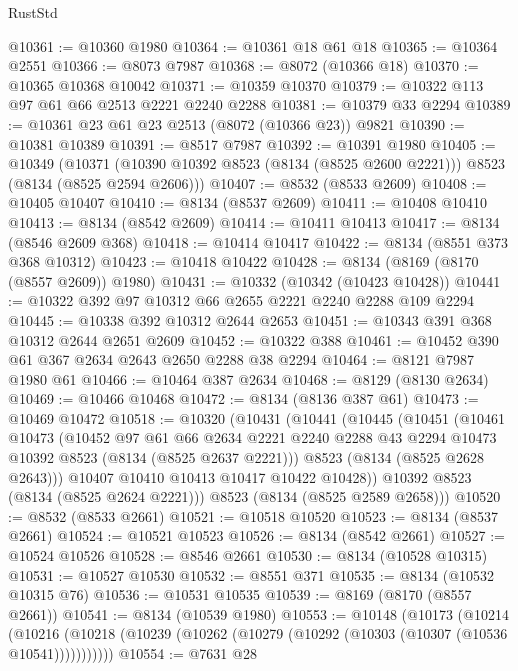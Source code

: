 \begin{lexlean}{RustStd}
\begin{coremodule}
{\begin{coremodule}
{{{{{{{{{{{{{{{{{{{{{{{{{{{{{{{{{{{{{{{{{{{{{{{{{{{{{@10361 := @10360 @1980
@10364 := @10361 @18 @61 @18
@10365 := @10364 @2551
@10366 := @8073 @7987
@10368 := @8072 (@10366 @18)
@10370 := @10365 @10368 @10042
@10371 := @10359 @10370
@10379 := @10322 @113 @97 @61 @66 @2513 @2221 @2240 @2288
@10381 := @10379 @33 @2294
@10389 := @10361 @23 @61 @23 @2513 (@8072 (@10366 @23)) @9821
@10390 := @10381 @10389
@10391 := @8517 @7987
@10392 := @10391 @1980
@10405 := @10349
    (@10371 (@10390 @10392 @8523 (@8134 (@8525 @2600 @2221))) @8523 (@8134 (@8525 @2594 @2606)))
@10407 := @8532 (@8533 @2609)
@10408 := @10405 @10407
@10410 := @8134 (@8537 @2609)
@10411 := @10408 @10410
@10413 := @8134 (@8542 @2609)
@10414 := @10411 @10413
@10417 := @8134 (@8546 @2609 @368)
@10418 := @10414 @10417
@10422 := @8134 (@8551 @373 @368 @10312)
@10423 := @10418 @10422
@10428 := @8134 (@8169 (@8170 (@8557 @2609)) @1980)
@10431 := @10332 (@10342 (@10423 @10428))
@10441 := @10322 @392 @97 @10312 @66 @2655 @2221 @2240 @2288 @109 @2294
@10445 := @10338 @392 @10312 @2644 @2653
@10451 := @10343 @391 @368 @10312 @2644 @2651 @2609
@10452 := @10322 @388
@10461 := @10452 @390 @61 @367 @2634 @2643 @2650 @2288 @38 @2294
@10464 := @8121 @7987 @1980 @61
@10466 := @10464 @387 @2634
@10468 := @8129 (@8130 @2634)
@10469 := @10466 @10468
@10472 := @8134 (@8136 @387 @61)
@10473 := @10469 @10472
@10518 := @10320
    (@10431
      (@10441
        (@10445
          (@10451
            (@10461
              @10473
              (@10452
                @97
                @61
                @66
                @2634
                @2221
                @2240
                @2288
                @43
                @2294
                @10473
                @10392
                @8523
                (@8134 (@8525 @2637 @2221)))
              @8523
              (@8134 (@8525 @2628 @2643)))
            @10407
            @10410
            @10413
            @10417
            @10422
            @10428))
        @10392
        @8523
        (@8134 (@8525 @2624 @2221)))
      @8523
      (@8134 (@8525 @2589 @2658)))
@10520 := @8532 (@8533 @2661)
@10521 := @10518 @10520
@10523 := @8134 (@8537 @2661)
@10524 := @10521 @10523
@10526 := @8134 (@8542 @2661)
@10527 := @10524 @10526
@10528 := @8546 @2661
@10530 := @8134 (@10528 @10315)
@10531 := @10527 @10530
@10532 := @8551 @371
@10535 := @8134 (@10532 @10315 @76)
@10536 := @10531 @10535
@10539 := @8169 (@8170 (@8557 @2661))
@10541 := @8134 (@10539 @1980)
@10553 := @10148
    (@10173
      (@10214
        (@10216 (@10218 (@10239 (@10262 (@10279 (@10292 (@10303 (@10307 (@10536 @10541)))))))))))
@10554 := @7631 @28
}}}}}}}}}}}}}}}}}}}}}}}}}}}}}}}}}}}}}}}}}}}}}}}}}}}}}
\end{coremodule}}
\end{coremodule}
\end{lexlean}
